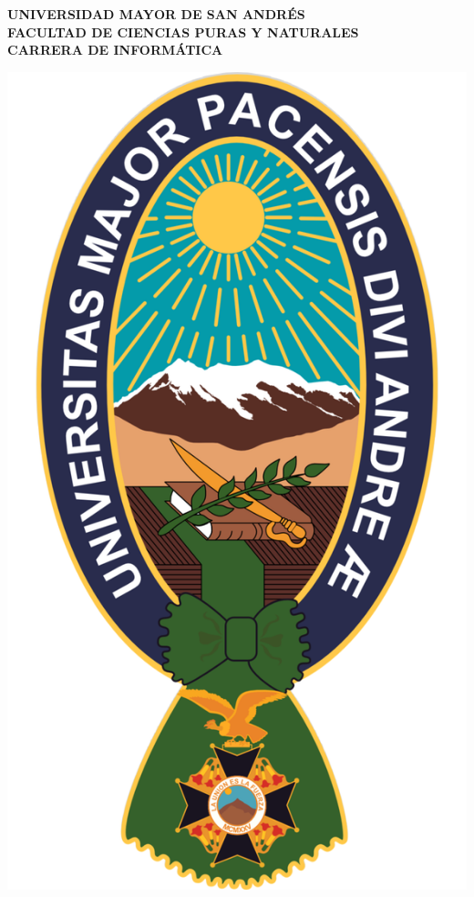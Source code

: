 \begin{titlepage} %
	\begin{center}
	    {\fontsize{20}{20}\selectfont \textbf{UNIVERSIDAD MAYOR DE SAN ANDRÉS}}\\
		{\fontsize{16}{16}\selectfont \textbf{FACULTAD DE CIENCIAS PURAS Y NATURALES\\
		CARRERA DE INFORMÁTICA}}
		
		\includegraphics[scale=0.20]{images/logo_umsa.png}
		

\end{center}
\end{titlepage}
